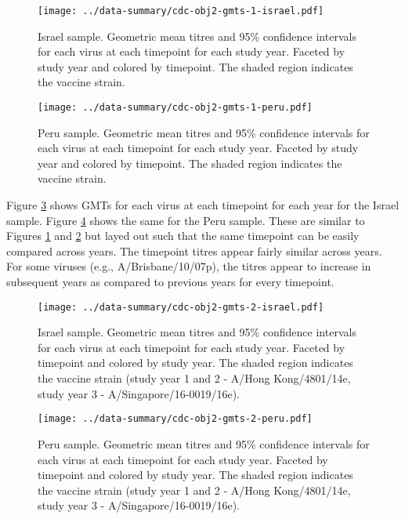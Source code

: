 \documentclass[12pt]{article}
\begin{document}
\begin{figure}
	\texttt{[image: ../data-summary/cdc-obj2-gmts-1-israel.pdf]}
	\caption{Israel sample. Geometric mean titres and 95\% confidence intervals for each virus at each timepoint for each study year. Faceted by study year and colored by timepoint. The shaded region indicates the vaccine strain.}
	\label{fig:cdc-obj2-gmts-1-israel}
\end{figure}

\begin{figure}
	\texttt{[image: ../data-summary/cdc-obj2-gmts-1-peru.pdf]}
	\caption{Peru sample. Geometric mean titres and 95\% confidence intervals for each virus at each timepoint for each study year. Faceted by study year and colored by timepoint. The shaded region indicates the vaccine strain.}
	\label{fig:cdc-obj2-gmts-1-peru}
\end{figure}

Figure \ref{fig:cdc-obj2-gmts-2-israel} shows GMTs for each virus at each timepoint for each year for the Israel sample. Figure \ref{fig:cdc-obj2-gmts-2-peru} shows the same for the Peru sample. These are similar to Figures \ref{fig:cdc-obj2-gmts-1-israel} and \ref{fig:cdc-obj2-gmts-1-peru} but layed out such that the same timepoint can be easily compared across years. The timepoint titres appear fairly similar across years. For some viruses (e.g., A/Brisbane/10/07p), the titres appear to increase in subsequent years as compared to previous years for every timepoint.

\begin{figure}
	\texttt{[image: ../data-summary/cdc-obj2-gmts-2-israel.pdf]}
	\caption{Israel sample. Geometric mean titres and 95\% confidence intervals for each virus at each timepoint for each study year. Faceted by timepoint and colored by study year. The shaded region indicates the vaccine strain (study year 1 and 2 - A/Hong Kong/4801/14e, study year 3 - A/Singapore/16-0019/16e).}
	\label{fig:cdc-obj2-gmts-2-israel}
\end{figure}

\begin{figure}
	\texttt{[image: ../data-summary/cdc-obj2-gmts-2-peru.pdf]}
	\caption{Peru sample. Geometric mean titres and 95\% confidence intervals for each virus at each timepoint for each study year. Faceted by timepoint and colored by study year. The shaded region indicates the vaccine strain (study year 1 and 2 - A/Hong Kong/4801/14e, study year 3 - A/Singapore/16-0019/16e).}
	\label{fig:cdc-obj2-gmts-2-peru}
\end{figure}
\end{document}

